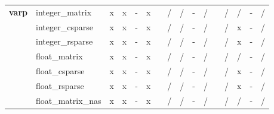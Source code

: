 \documentclass{article}
\begin{document}
\begin{longtable}{llllllllllllllll}
\textbf{varp}   & integer\_matrix           & \cellcolor[HTML]{B7E1CD}x & \cellcolor[HTML]{B7E1CD}x & \cellcolor[HTML]{CFE2F3}- & \cellcolor[HTML]{B7E1CD}x &  & \cellcolor[HTML]{F4CCCC}/ & \cellcolor[HTML]{F4CCCC}/ & \cellcolor[HTML]{CFE2F3}- & \cellcolor[HTML]{F4CCCC}/ &  & \cellcolor[HTML]{F4CCCC}/ & \cellcolor[HTML]{F4CCCC}/ & \cellcolor[HTML]{CFE2F3}- & \cellcolor[HTML]{F4CCCC}/ \\
                & integer\_csparse          & \cellcolor[HTML]{B7E1CD}x & \cellcolor[HTML]{B7E1CD}x & \cellcolor[HTML]{CFE2F3}- & \cellcolor[HTML]{B7E1CD}x &  & \cellcolor[HTML]{F4CCCC}/ & \cellcolor[HTML]{F4CCCC}/ & \cellcolor[HTML]{CFE2F3}- & \cellcolor[HTML]{F4CCCC}/ &  & \cellcolor[HTML]{F4CCCC}/ & \cellcolor[HTML]{B7E1CD}x & \cellcolor[HTML]{CFE2F3}- & \cellcolor[HTML]{F4CCCC}/ \\
                & integer\_rsparse          & \cellcolor[HTML]{B7E1CD}x & \cellcolor[HTML]{B7E1CD}x & \cellcolor[HTML]{CFE2F3}- & \cellcolor[HTML]{B7E1CD}x &  & \cellcolor[HTML]{F4CCCC}/ & \cellcolor[HTML]{F4CCCC}/ & \cellcolor[HTML]{CFE2F3}- & \cellcolor[HTML]{F4CCCC}/ &  & \cellcolor[HTML]{F4CCCC}/ & \cellcolor[HTML]{B7E1CD}x & \cellcolor[HTML]{CFE2F3}- & \cellcolor[HTML]{F4CCCC}/ \\
                & float\_matrix             & \cellcolor[HTML]{B7E1CD}x & \cellcolor[HTML]{B7E1CD}x & \cellcolor[HTML]{CFE2F3}- & \cellcolor[HTML]{B7E1CD}x &  & \cellcolor[HTML]{F4CCCC}/ & \cellcolor[HTML]{F4CCCC}/ & \cellcolor[HTML]{CFE2F3}- & \cellcolor[HTML]{F4CCCC}/ &  & \cellcolor[HTML]{F4CCCC}/ & \cellcolor[HTML]{F4CCCC}/ & \cellcolor[HTML]{CFE2F3}- & \cellcolor[HTML]{F4CCCC}/ \\
                & float\_csparse            & \cellcolor[HTML]{B7E1CD}x & \cellcolor[HTML]{B7E1CD}x & \cellcolor[HTML]{CFE2F3}- & \cellcolor[HTML]{B7E1CD}x &  & \cellcolor[HTML]{F4CCCC}/ & \cellcolor[HTML]{F4CCCC}/ & \cellcolor[HTML]{CFE2F3}- & \cellcolor[HTML]{F4CCCC}/ &  & \cellcolor[HTML]{F4CCCC}/ & \cellcolor[HTML]{B7E1CD}x & \cellcolor[HTML]{CFE2F3}- & \cellcolor[HTML]{F4CCCC}/ \\
                & float\_rsparse            & \cellcolor[HTML]{B7E1CD}x & \cellcolor[HTML]{B7E1CD}x & \cellcolor[HTML]{CFE2F3}- & \cellcolor[HTML]{B7E1CD}x &  & \cellcolor[HTML]{F4CCCC}/ & \cellcolor[HTML]{F4CCCC}/ & \cellcolor[HTML]{CFE2F3}- & \cellcolor[HTML]{F4CCCC}/ &  & \cellcolor[HTML]{F4CCCC}/ & \cellcolor[HTML]{B7E1CD}x & \cellcolor[HTML]{CFE2F3}- & \cellcolor[HTML]{F4CCCC}/ \\
                & float\_matrix\_nas        & \cellcolor[HTML]{B7E1CD}x & \cellcolor[HTML]{B7E1CD}x & \cellcolor[HTML]{CFE2F3}- & \cellcolor[HTML]{B7E1CD}x &  & \cellcolor[HTML]{F4CCCC}/ & \cellcolor[HTML]{F4CCCC}/ & \cellcolor[HTML]{CFE2F3}- & \cellcolor[HTML]{F4CCCC}/ &  & \cellcolor[HTML]{F4CCCC}/ & \cellcolor[HTML]{F4CCCC}/ & \cellcolor[HTML]{CFE2F3}- & \cellcolor[HTML]{F4CCCC}/ \\

\end{longtable}
\end{document}
